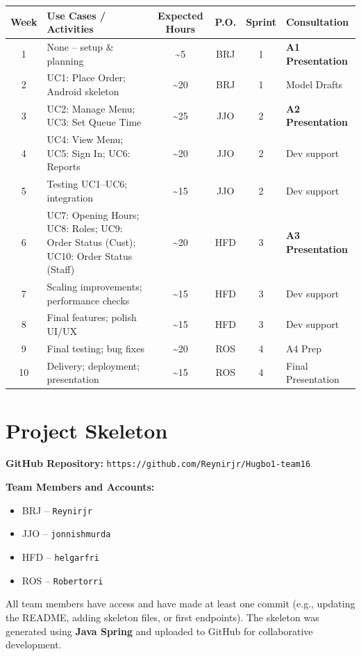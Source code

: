 \documentclass{article}
\begin{document}
\begin{center}
\renewcommand{\arraystretch}{1.6} %
\large %
\begin{adjustbox}{max width=\textwidth}
\begin{tabular}{|c|>{\raggedright\arraybackslash}p{5cm}|c|c|c|>{\raggedright\arraybackslash}p{4cm}|}
\hline
\textbf{Week} & \textbf{Use Cases / Activities} & \textbf{Expected Hours} & \textbf{P.O.} & \textbf{Sprint} & \textbf{Consultation} \\ \hline
1  & None -- setup \& planning                    & \textasciitilde5  & BRJ & 1 & \textbf{A1 Presentation} \\ \hline
2  & UC1: Place Order; Android skeleton           & \textasciitilde20 & BRJ & 1 & Model Drafts \\ \hline
3  & UC2: Manage Menu; UC3: Set Queue Time        & \textasciitilde25 & JJO & 2 & \textbf{A2 Presentation} \\ \hline
4  & UC4: View Menu; UC5: Sign In; UC6: Reports   & \textasciitilde20 & JJO & 2 & Dev support \\ \hline
5  & Testing UC1--UC6; integration                & \textasciitilde15 & JJO & 2 & Dev support \\ \hline
6  & UC7: Opening Hours; UC8: Roles; UC9: Order Status (Cust); UC10: Order Status (Staff) & \textasciitilde20 & HFD & 3 & \textbf{A3 Presentation} \\ \hline
7  & Scaling improvements; performance checks     & \textasciitilde15 & HFD & 3 & Dev support \\ \hline
8  & Final features; polish UI/UX                 & \textasciitilde15 & HFD & 3 & Dev support \\ \hline
9  & Final testing; bug fixes                     & \textasciitilde20 & ROS & 4 & A4 Prep \\ \hline
10 & Delivery; deployment; presentation           & \textasciitilde15 & ROS & 4 & Final Presentation \\ \hline
\end{tabular}
\end{adjustbox}
\end{center}


\section{Project Skeleton}

\textbf{GitHub Repository:} \texttt{https://github.com/Reynirjr/Hugbo1-team16}

\textbf{Team Members and Accounts:}
\begin{itemize}
    \item BRJ -- \texttt{Reynirjr}
    \item JJO -- \texttt{jonnishmurda}
    \item HFD -- \texttt{helgarfri}
    \item ROS -- \texttt{Robertorri}
\end{itemize}

All team members have access and have made at least one commit (e.g., updating the README, adding skeleton files, or first endpoints).  
The skeleton was generated using \textbf{Java Spring} and uploaded to GitHub for collaborative development.
\end{document}

